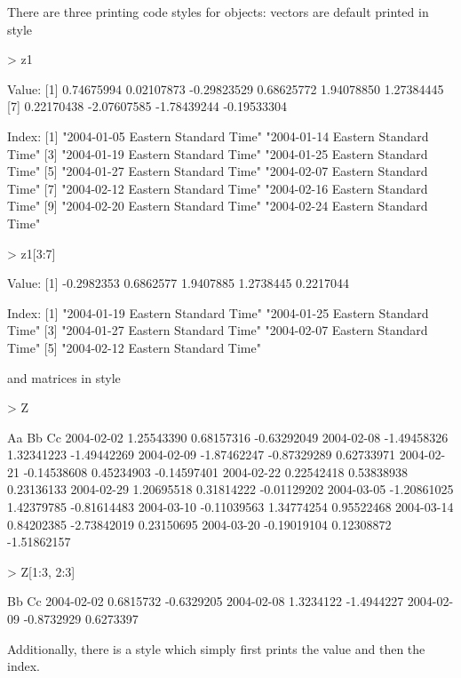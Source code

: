 \documentclass{Z}
\begin{document}
There are three printing code styles for  objects: vectors are default
printed in  style
\begin{Schunk}
\begin{Sinput}
> z1
\end{Sinput}
\begin{Soutput}
Value:
 [1]  0.74675994  0.02107873 -0.29823529  0.68625772  1.94078850  1.27384445
 [7]  0.22170438 -2.07607585 -1.78439244 -0.19533304

Index:
 [1] "2004-01-05 Eastern Standard Time" "2004-01-14 Eastern Standard Time"
 [3] "2004-01-19 Eastern Standard Time" "2004-01-25 Eastern Standard Time"
 [5] "2004-01-27 Eastern Standard Time" "2004-02-07 Eastern Standard Time"
 [7] "2004-02-12 Eastern Standard Time" "2004-02-16 Eastern Standard Time"
 [9] "2004-02-20 Eastern Standard Time" "2004-02-24 Eastern Standard Time"
\end{Soutput}
\begin{Sinput}
> z1[3:7]
\end{Sinput}
\begin{Soutput}
Value:
[1] -0.2982353  0.6862577  1.9407885  1.2738445  0.2217044

Index:
[1] "2004-01-19 Eastern Standard Time" "2004-01-25 Eastern Standard Time"
[3] "2004-01-27 Eastern Standard Time" "2004-02-07 Eastern Standard Time"
[5] "2004-02-12 Eastern Standard Time"
\end{Soutput}
\end{Schunk}
and matrices in  style
\begin{Schunk}
\begin{Sinput}
> Z
\end{Sinput}
\begin{Soutput}
           Aa          Bb          Cc         
2004-02-02  1.25543390  0.68157316 -0.63292049
2004-02-08 -1.49458326  1.32341223 -1.49442269
2004-02-09 -1.87462247 -0.87329289  0.62733971
2004-02-21 -0.14538608  0.45234903 -0.14597401
2004-02-22  0.22542418  0.53838938  0.23136133
2004-02-29  1.20695518  0.31814222 -0.01129202
2004-03-05 -1.20861025  1.42379785 -0.81614483
2004-03-10 -0.11039563  1.34774254  0.95522468
2004-03-14  0.84202385 -2.73842019  0.23150695
2004-03-20 -0.19019104  0.12308872 -1.51862157
\end{Soutput}
\begin{Sinput}
> Z[1:3, 2:3]
\end{Sinput}
\begin{Soutput}
           Bb         Cc        
2004-02-02  0.6815732 -0.6329205
2004-02-08  1.3234122 -1.4944227
2004-02-09 -0.8732929  0.6273397
\end{Soutput}
\end{Schunk}
Additionally, there is a  style which simply first prints the value 
and then the index.
\end{document}
